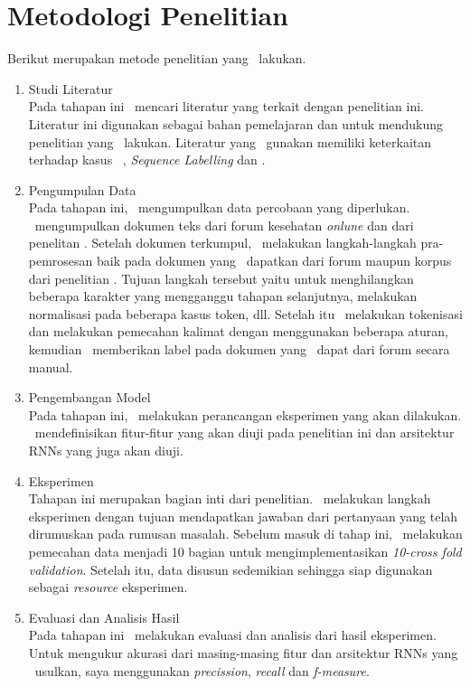 \section{Metodologi Penelitian}
Berikut merupakan metode penelitian yang \saya~lakukan.
\begin{enumerate}
	\item Studi Literatur\\
	Pada tahapan ini \saya~mencari literatur yang terkait dengan penelitian ini. Literatur ini digunakan sebagai bahan pemelajaran dan untuk mendukung penelitian yang \saya~lakukan. Literatur yang \saya~gunakan memiliki keterkaitan terhadap kasus \mer~, \textit{Sequence Labelling} dan \rnn.
	
	\item Pengumpulan Data \\
	Pada tahapan ini, \saya~mengumpulkan data percobaan yang diperlukan. \Saya~mengumpulkan dokumen teks dari forum kesehatan \textit{onlune} dan dari penelitan \cite{skripsiKakRadit}. Setelah dokumen terkumpul, \saya~melakukan langkah-langkah pra-pemrosesan baik pada dokumen yang \saya~dapatkan dari forum maupun korpus dari penelitian \cite{skripsiKakRadit}. Tujuan langkah tersebut yaitu untuk menghilangkan beberapa karakter yang mengganggu tahapan selanjutnya, melakukan normalisasi pada beberapa kasus token, dll. Setelah itu \saya~melakukan tokenisasi dan melakukan pemecahan kalimat dengan menggunakan beberapa aturan, kemudian \saya~memberikan label pada dokumen yang \saya~dapat dari forum secara manual. 
	
	\item Pengembangan Model\\
	Pada tahapan ini, \saya~melakukan perancangan eksperimen yang akan dilakukan. \Saya~mendefinisikan fitur-fitur yang akan diuji pada penelitian ini dan arsitektur RNNs yang juga akan diuji.
		
	\item Eksperimen \\
	Tahapan ini merupakan bagian inti dari penelitian. \saya~melakukan langkah eksperimen dengan tujuan mendapatkan jawaban dari pertanyaan yang telah dirumuskan pada rumusan masalah. Sebelum masuk di tahap ini, \saya~melakukan pemecahan data menjadi 10 bagian untuk mengimplementasikan \textit{10-cross fold validation}. Setelah itu, data disusun sedemikian sehingga siap digunakan sebagai \textit{resource} eksperimen.
	
	\item Evaluasi dan Analisis Hasil \\
	Pada tahapan ini \saya~melakukan evaluasi dan analisis dari hasil eksperimen. Untuk mengukur akurasi dari masing-masing fitur dan arsitektur RNNs yang \saya~usulkan, saya menggunakan \textit{precission}, \textit{recall} dan \textit{f-measure}.
		

\end{enumerate}
